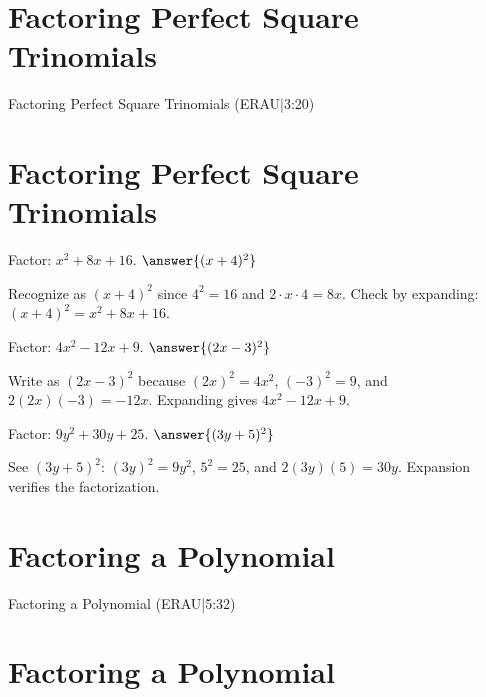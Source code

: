 \documentclass{ximera}
\begin{document}
\section*{Factoring Perfect Square Trinomials}

Factoring Perfect Square Trinomials (ERAU|3:20)



\section*{Factoring Perfect Square Trinomials}

\begin{problem}
Factor: \(x^2 + 8x + 16\). $\answer{(x+4)^2}$
\begin{feedback}
Recognize as \((x+4)^2\) since \(4^2=16\) and \(2\cdot x\cdot 4=8x\). Check by expanding: \((x+4)^2=x^2+8x+16\).
\end{feedback}
\end{problem}

\begin{problem}
Factor: \(4x^2 - 12x + 9\). $\answer{(2x-3)^2}$
\begin{feedback}
Write as \((2x-3)^2\) because \((2x)^2=4x^2\), \((-3)^2=9\), and \(2(2x)(-3)=-12x\). Expanding gives \(4x^2-12x+9\).
\end{feedback}
\end{problem}

\begin{problem}
Factor: \(9y^2 + 30y + 25\). $\answer{(3y+5)^2}$
\begin{feedback}
See \((3y+5)^2\): \((3y)^2=9y^2\), \(5^2=25\), and \(2(3y)(5)=30y\). Expansion verifies the factorization.
\end{feedback}
\end{problem}


\section*{Factoring a Polynomial}

Factoring a Polynomial (ERAU|5:32)



\section*{Factoring a Polynomial}
\end{document}
